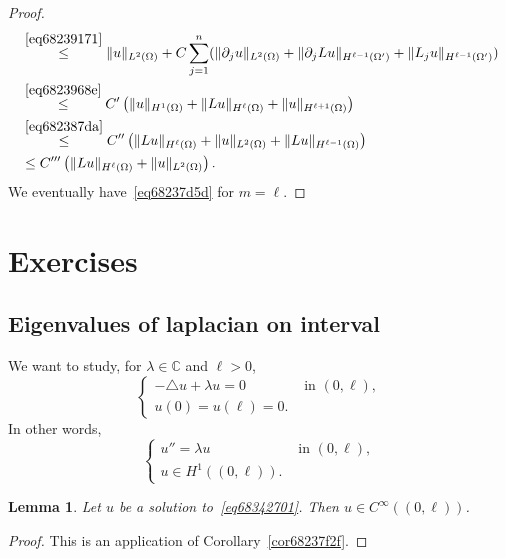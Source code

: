 \documentclass[a4paper,9pt]{amsart}
\newcommand{\C}{\mathbb{C}}	%
\newcommand{\de}{\partial}		%
\newcommand{\laplacian}{\triangle}
\theoremstyle{plain}
\newtheorem{lemma}[proposition]{Lemma}
\theoremstyle{definition}
\theoremstyle{remark}
\begin{document}
\begin{proof}
\begin{align}
		&\overset{\eqref{eq68239171}}\le \|u\|_{L^2(\Omega)} 
			+ C \sum_{j=1}^n (\|\de_ju\|_{L^2(\Omega)} + \|\de_jLu\|_{H^{\ell-1}(\Omega')} + \|L_ju\|_{H^{\ell-1}(\Omega')}) \\
		&\overset{\eqref{eq6823968e}}\le C' \left( \|u\|_{H^1(\Omega)} + \|Lu\|_{H^{\ell}(\Omega)} + \|u\|_{H^{\ell+1}(\Omega)} \right) \\
		&\overset{\eqref{eq682387da}}\le C'' \left( \|Lu\|_{H^{\ell}(\Omega)} + \|u\|_{L^2(\Omega)} + \|Lu\|_{H^{\ell-1}(\Omega)} \right) \\
		&\le C''' \left( \|Lu\|_{H^{\ell}(\Omega)} + \|u\|_{L^2(\Omega)} \right) .
	\end{align}
	We eventually have~\eqref{eq68237d5d} for $m=\ell$.
\end{proof}


\newpage
\section{Exercises}

\subsection{Eigenvalues of laplacian on interval}\label{subs6890901c}
We want to study, for $\lambda\in\C$ and $\ell>0$,
\begin{equation}
\begin{cases}
	-\laplacian u + \lambda u = 0 &\text{ in }(0,\ell) ,\\
	u(0) = u(\ell) = 0 .
\end{cases}
\end{equation}
In other words,
\begin{equation}\label{eq68342701}
\begin{cases}
	u'' = \lambda u &\text{ in }(0,\ell) ,\\
	u\in H^1((0,\ell)) .
\end{cases}
\end{equation}

\begin{lemma}\label{lem6834273f}
	Let $u$ be a solution to~\eqref{eq68342701}.
	Then $u\in C^\infty((0,\ell))$.
\end{lemma}
\begin{proof}
	This is an application of Corollary~\ref{cor68237f2f}.
\end{proof}
\end{document}
